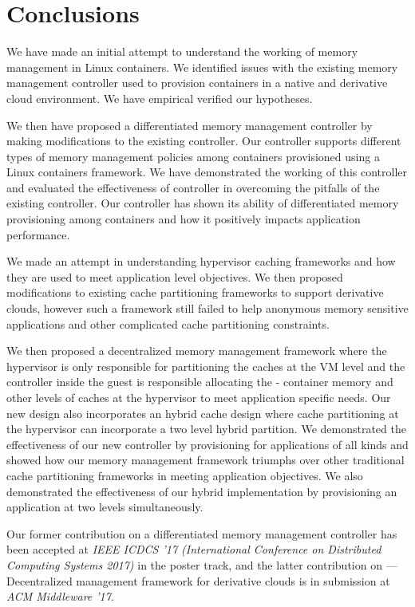 
\chapter{Conclusions}
  
    We have made an initial attempt to understand the working of memory management in Linux
    containers. We identified issues with the existing memory management controller used to
    provision containers in a native and derivative cloud environment. We have empirical 
    verified our hypotheses. 
    
    We then have proposed a differentiated memory management 
    controller by making modifications to the existing controller. Our controller supports
    different types of memory management policies among containers provisioned using a Linux
    containers framework. We have demonstrated the working of this controller and evaluated the 
    effectiveness of controller in overcoming the pitfalls of the existing controller. 
    Our controller has shown its ability of differentiated memory provisioning among containers 
    and how it positively impacts application performance.
  
    We made an attempt in understanding hypervisor caching frameworks and how they are used to 
    meet application level objectives. We then proposed modifications to existing cache partitioning
    frameworks to support derivative clouds, however such a framework still failed to help anonymous 
    memory sensitive applications and other complicated cache partitioning constraints. 
    
    We then proposed a decentralized memory management framework where the hypervisor is only responsible 
    for partitioning the caches at the VM level and the controller inside the guest is responsible allocating the 
    - container memory and other levels of caches at the hypervisor to meet application specific needs. Our new design 
    also incorporates an hybrid cache design where cache partitioning at the hypervisor can incorporate a 
    two level hybrid partition. We demonstrated the effectiveness of our new controller by provisioning for
    applications of all kinds and showed how our memory management framework triumphs over other traditional 
    cache partitioning frameworks in meeting application objectives. We also demonstrated the effectiveness of
    our hybrid implementation by provisioning an application at two levels simultaneously. 
    
    Our former contribution on a differentiated memory management controller has been accepted at 
    \textit{IEEE ICDCS '17 (International Conference on Distributed Computing Systems 2017)} in the poster track, 
    and the latter contribution on \dd{}---Decentralized management framework for derivative clouds is in
    submission at \textit{ACM Middleware '17}.
    
    